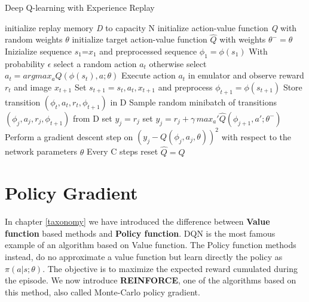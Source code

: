 \begin{algorithm}
	\caption{Deep Q-learning with Experience Replay}
	\label{algo:DQN}
	\begin{algorithmic}[]
		\State initialize replay memory \textit{D} to capacity {N}
		\State initialize action-value function \textit{Q} with random weights {$\theta$}
        \State initialize target action-value function ${\hat{Q}}$ with weights ${\theta^-}={\theta}$
			\State Inizialize sequence $s_1$=$x_1$ and preprocessed sequence $\phi_1= \phi(s_1)$
            		\State With probability $\epsilon$ select a random action $a_t$ 
                   \State otherwise select $a_t = argmax_aQ(\phi(s_t),a;\theta)$
                   \State Execute action $a_t$ in emulator and observe reward $r_t$ and image $x_{t+1}$
                   \State Set $s_{t+1} = s_t,a_t,x_{t+1}$ and preprocess $	\phi_{t+1} = \phi(s_{t+1})$
                   \State Store transition $(\phi_t,a_t,r_t,\phi_{t+1})$ in D
                   \State Sample random minibatch of transitions $(\phi_j,a_j,r_j,\phi_{t+1})$ from D
                   \State set $y_j = r_j$
                   \Else
                   \State set $y_j = r_j+\gamma\,max_a'\hat{Q}\left (\phi_{j+1},a';\theta^- \right)$
                   \EndIf
                   \State Perform a gradient descent step on $\left ( y_j - Q \left( \phi_j,a_j,\theta \right) \right)^2$ 
                   \State with respect to the network parameters $\theta$
                   \State Every C steps reset $\hat{Q}=Q$
               
                   
                    
        	\EndFor    
        \EndFor
	\end{algorithmic}
\end{algorithm}

\section{Policy Gradient}
In chapter \ref{taxonomy} we have introduced the difference between \textbf{Value function} based methods and \textbf{Policy function}. 
DQN is the most famous example of an algorithm based on Value function.
The Policy function methods instead, do no approximate a value function but learn directly the policy as $\pi(a|s;\theta)$. 
The objective is to maximize the expected reward cumulated during the episode.
We now introduce \textbf{REINFORCE}, one of the algorithms based on this method, also called Monte-Carlo policy gradient.


